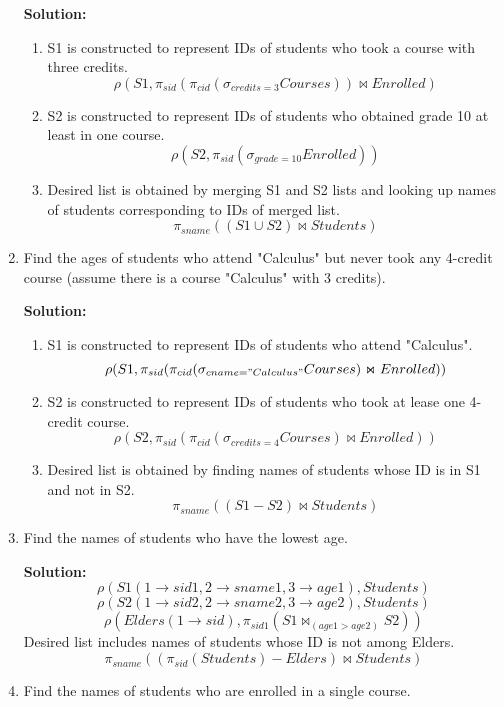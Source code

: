 \begin{enumerate}
  \textbf{Solution:}
  \begin{enumerate}
  \item S1 is constructed to represent IDs of students who took a course with three credits.
  $$\displaystyle \rho(S1, \pi_{sid} (\pi_{cid} (\sigma_{credits=3}Courses) ) \Join Enrolled)$$
  \item S2 is constructed to represent IDs of students who obtained grade 10 at least in one course.
  $$\displaystyle \rho(S2, \pi_{sid}(\sigma_{grade=10}Enrolled) ) $$
  \item Desired list is obtained by merging S1 and S2 lists and looking up names of students corresponding to IDs of merged list.
  $$\displaystyle \pi_{sname}((S1 \cup S2) \Join Students) $$
  \end{enumerate}
  
  \item Find the ages of students who attend "Calculus" but never took any 4-credit course (assume there is a course "Calculus" with 3 credits).
  
  \textbf{Solution:}
  \begin{enumerate}
  \item S1 is constructed to represent IDs of students who attend "Calculus".
  $$ \displaystyle \rho(S1,   \pi_{sid}( \pi_{cid}( \sigma_{cname="Calculus"}Courses) \Join Enrolled) ) $$
  \item S2 is constructed to represent IDs of students who took at lease one 4-credit course.
  $$ \displaystyle \rho(S2, \pi_{sid} (\pi_{cid}( \sigma_{credits=4}Courses) \Join Enrolled) ) $$
  \item Desired list is obtained by finding names of students whose ID is in S1 and not in S2.
  $$ \displaystyle \pi_{sname}((S1-S2)\Join Students) $$
  \end{enumerate}
  
  \item Find the names of students who have the lowest age.
  
  \textbf{Solution:}
  $$\displaystyle \rho(S1(1\rightarrow sid1, 2\rightarrow sname1, 3\rightarrow age1),Students)$$
  $$\rho(S2(1\rightarrow sid2, 2\rightarrow sname2, 3\rightarrow age2),Students)$$
  $$\rho(Elders(1\rightarrow sid),\pi_{sid1}(S1 \Join_{(age1>age2)} S2)) $$
  Desired list includes names of students whose ID is not among Elders.
  $$ \pi_{sname}((\pi_{sid}(Students)-Elders) \Join Students) $$
  
  \item Find the names of students who are enrolled in a single course.
  

\end{enumerate}
